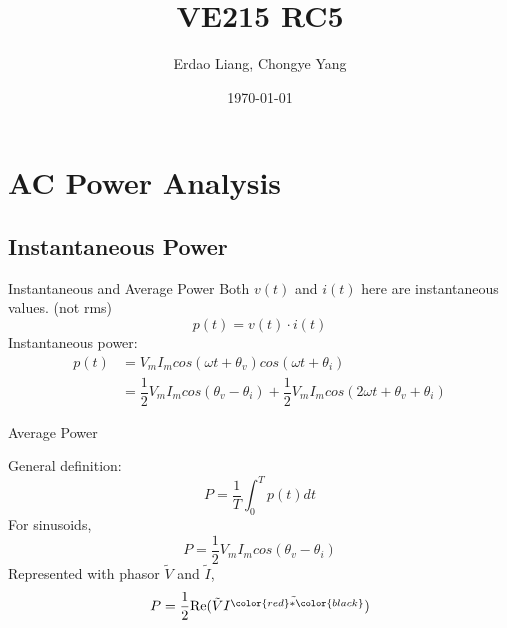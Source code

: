 \documentclass{beamer}
\title[VE215 RC5]{VE215 RC5}
\author{Erdao Liang, Chongye Yang}
\institute[UM-SJTU JI] 
{UM-SJTU JI}
\date{\today}
\begin{document}

\begin{frame}
\titlepage %
\end{frame}



\section{AC Power Analysis}

\subsection{Instantaneous Power}
\begin{frame}{Instantaneous and Average Power}
Both $v(t)$ and $i(t)$ here are instantaneous values. \textcolor[rgb]{1,0,0}{(not rms)}
$$p(t)=v(t) \cdot i(t)$$
Instantaneous power:
\begin{equation*}
\begin{aligned}
p(t) &= V_{m}I_{m}cos(\omega t + \theta_{v})cos(\omega t + \theta_{i})\\
&= \dfrac{1}{2}V_{m}I_{m}cos(\theta_{v}-\theta_{i})+\dfrac{1}{2}V_{m}I_{m}cos(2 \omega t + \theta_{v} + \theta_{i})
\end{aligned}
\end{equation*}

\end{frame}


\begin{frame}{Average Power}

General definition:
$$P = \frac{1}{T}\int_0^Tp(t)dt$$
For sinusoids,
$$P=\dfrac{1}{2}V_{m}I_{m} cos(\theta_{v}-\theta_{i})$$
Represented with phasor $\tilde{V}$ and $\tilde{I}$,
$$P = \frac12\mathrm{Re}(\tilde{V}\tilde{I^{\color{red}*\color{black}}})$$

\end{frame}
\end{document}
